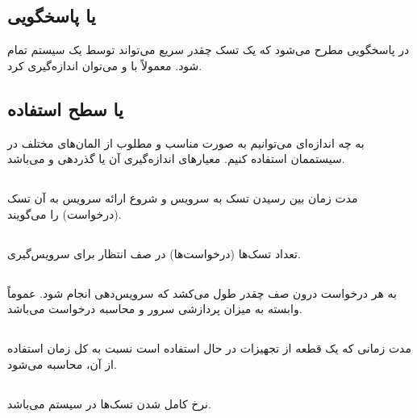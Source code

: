 \documentclass[a4paper]{article}
\begin{document}
\subsection{ یا پاسخگویی}

در پاسخگویی مطرح می‌شود که یک تسک چقدر سریع می‌تواند توسط یک سیستم تمام شود.
معمولاً با  و  می‌توان اندازه‌گیری کرد.

\subsection{ یا سطح استفاده}

به چه اندازه‌ای می‌توانیم به صورت مناسب و مطلوب از المان‌های مختلف در سیستممان
استفاده کنیم. معیار‌های اندازه‌گیری آن  یا گذردهی و
 می‌باشد.

\subsection{}

مدت زمان بین رسیدن تسک به سرویس و شروع ارائه سرویس به آن تسک (درخواست) را
می‌گویند.

\subsection{}

تعداد تسک‌ها (درخواست‌ها) در صف انتظار برای سرویس‌گیری.

\subsection{}

به هر درخواست درون صف چقدر طول می‌کشد که سرویس‌دهی انجام شود. عموماً وابسته به
میزان پردازشی سرور و محاسبه درخواست می‌باشد.

\subsection{}

مدت زمانی که یک قطعه از تجهیزات در حال استفاده است نسبت به کل زمان استفاده از
آن، محاسبه می‌شود.

\subsection{}

نرخ کامل شدن تسک‌ها در سیستم می‌باشد.
\end{document}
